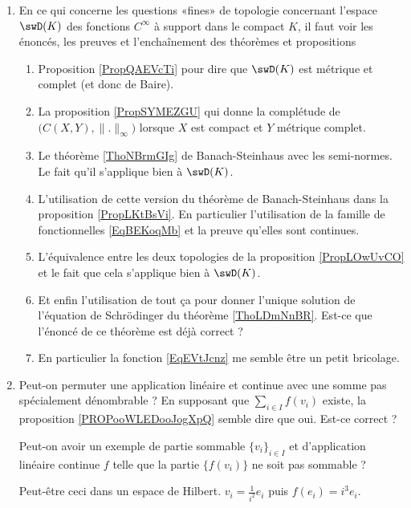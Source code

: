 \begin{enumerate}
        \item
            En ce qui concerne les questions «fines» de topologie concernant l'espace \( \swD(K)\) des fonctions \(  C^{\infty}\) à support dans le compact \( K\), il faut voir les énoncés, les preuves et l'enchaînement des théorèmes et propositions
            \begin{enumerate}
                \item Proposition \ref{PropQAEVcTi} pour dire que \( \swD(K)\) est métrique et complet (et donc de Baire).
                \item La proposition \ref{PropSYMEZGU} qui donne la complétude de \( \big( C(X,Y),\| . \|_{\infty} \big)\) lorsque \( X\) est compact et \( Y\) métrique complet.
                \item Le théorème \ref{ThoNBrmGIg} de Banach-Steinhaus avec les semi-normes. Le fait qu'il s'applique bien à \( \swD(K)\).
                \item L'utilisation de cette version du théorème de Banach-Steinhaus dans la proposition \ref{PropLKtBsVi}. En particulier l'utilisation de la famille de fonctionnelles \eqref{EqBEKoqMb} et la preuve qu'elles sont continues.
                \item
                    L'équivalence entre les deux topologies de la proposition \ref{PropLOwUvCO} et le fait que cela s'applique bien à \( \swD(K)\).
                \item
                    Et enfin l'utilisation de tout ça pour donner l'unique solution de l'équation de Schrödinger du théorème \ref{ThoLDmNnBR}. Est-ce que l'énoncé de ce théorème est déjà correct ?
                \item
                    En particulier la fonction \eqref{EqEVtJcnz} me semble être un petit bricolage. 
            \end{enumerate}
    \item
        Peut-on permuter une application linéaire et continue avec une somme pas spécialement dénombrable ? En supposant que \( \sum_{i\in I}f(v_i)\) existe, la proposition \ref{PROPooWLEDooJogXpQ} semble dire que oui. Est-ce correct ?

        Peut-on avoir un exemple de partie sommable \( \{ v_i \}_{i\in I}\) et d'application linéaire continue \( f\) telle que la partie \( \{ f(v_i) \}\) ne soit pas sommable ?

        Peut-être ceci dans un espace de Hilbert.  \( v_i=\frac{1}{ i^2 }e_i\) puis \( f(e_i)=i^3e_i\). 


\end{enumerate}
